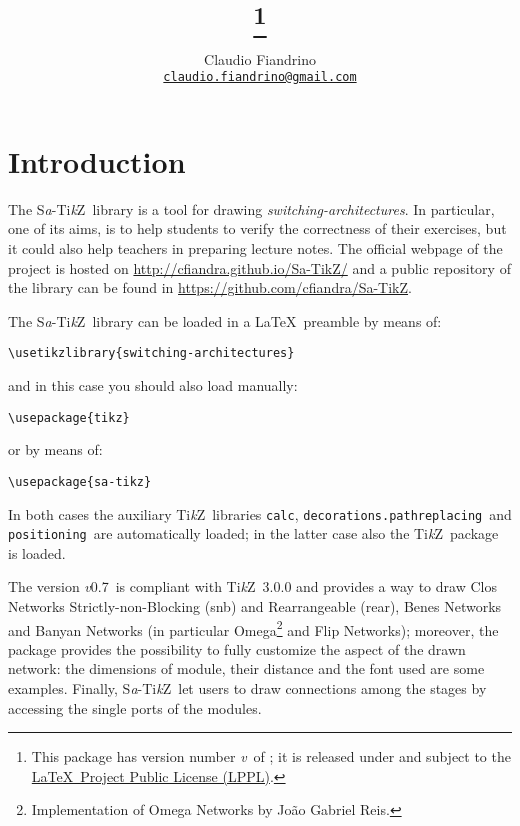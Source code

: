 \documentclass{ltxdoc}
\title{\saTikZ\footnote{This package has version number \textit{v}\version\ of \versiondate; it is released under and subject to the \href{http://www.latex-project.org/lppl/}{\LaTeX\ Project Public License (LPPL)}.}}
\author{Claudio Fiandrino \\ \small\href{mailto:claudio.fiandrino@gmail.com}{\texttt{claudio.fiandrino@gmail.com}}}
\date{\versiondate}
\newcommand\Tikz{Ti\textit kZ}
\newcommand{\saTikZ}{S\textit{a}-\Tikz}
\newcommand{\version}{0.7}
\begin{document}
\maketitle
\tableofcontents

\section*{Introduction}
The \saTikZ\ library is a tool for drawing \emph{switching-architectures}. In particular, one of its aims, is to help students to verify the correctness of their exercises, but it could also help teachers in preparing lecture notes. The official webpage of the project is hosted on \href{http://cfiandra.github.io/Sa-TikZ/}{http://cfiandra.github.io/Sa-TikZ/} and a public  repository of the library can be found in \href{https://github.com/cfiandra/Sa-TikZ}{https://github.com/cfiandra/Sa-TikZ}.

The \saTikZ\ library can be loaded in a \LaTeX\ preamble by means of:
\begin{flushleft}
\verb|\usetikzlibrary{|\bgroup\color{red!75!black}\verb|switching-architectures|\egroup\verb|}|
\end{flushleft}
and in this case you should also load manually:
\begin{flushleft}
\verb|\usepackage{|\bgroup\color{red!75!black}\verb|tikz|\egroup\verb|}|
\end{flushleft}
or by means of:
\begin{flushleft}
\verb|\usepackage{|\bgroup\color{red!75!black}\verb|sa-tikz|\egroup\verb|}|
\end{flushleft}
In both cases the auxiliary \Tikz\ libraries \bgroup\color{red!75!black}\verb|calc|\egroup{}, \bgroup\color{red!75!black}\verb|decorations.pathreplacing|\egroup\ and \bgroup\color{red!75!black}\verb|positioning|\egroup\ are automatically loaded; in the latter case also the \Tikz\ package is loaded.

The version \textit{v}\version\ is compliant with \Tikz\ 3.0.0 and provides a way to draw Clos Networks Strictly-non-Blocking (snb) and Rearrangeable (rear), Benes Networks and Banyan Networks (in particular Omega\footnote{Implementation of Omega Networks by João Gabriel Reis.} and Flip Networks); moreover, the package provides the possibility to fully customize the aspect of the drawn network: the dimensions of module, their distance and the font used are some examples. Finally, \saTikZ\ let users to draw connections among the stages by accessing the single ports of the modules.
\end{document}

